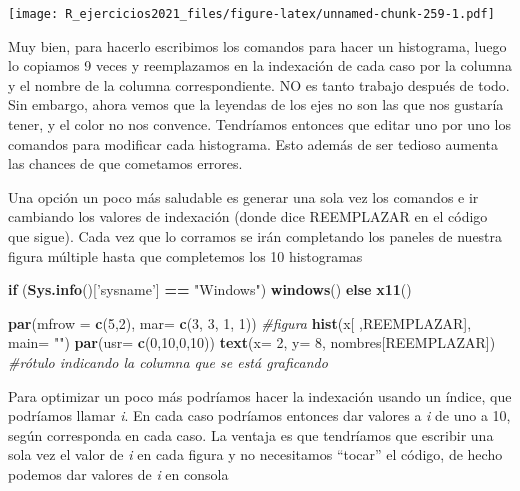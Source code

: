 \documentclass[]{book}
\newenvironment{Shaded}{\begin{snugshade}}{\end{snugshade}}
\newcommand{\CommentTok}[1]{\textcolor[rgb]{0.56,0.35,0.01}{\textit{#1}}}
\newcommand{\ControlFlowTok}[1]{\textcolor[rgb]{0.13,0.29,0.53}{\textbf{#1}}}
\newcommand{\DataTypeTok}[1]{\textcolor[rgb]{0.13,0.29,0.53}{#1}}
\newcommand{\DecValTok}[1]{\textcolor[rgb]{0.00,0.00,0.81}{#1}}
\newcommand{\KeywordTok}[1]{\textcolor[rgb]{0.13,0.29,0.53}{\textbf{#1}}}
\newcommand{\NormalTok}[1]{#1}
\newcommand{\OperatorTok}[1]{\textcolor[rgb]{0.81,0.36,0.00}{\textbf{#1}}}
\newcommand{\StringTok}[1]{\textcolor[rgb]{0.31,0.60,0.02}{#1}}
\begin{document}
\texttt{[image: R\_ejercicios2021\_files/figure-latex/unnamed-chunk-259-1.pdf]}

Muy bien, para hacerlo escribimos los comandos para hacer un histograma, luego lo copiamos 9 veces y reemplazamos en la indexación de cada caso por la columna y el nombre de la columna correspondiente. NO es tanto trabajo después de todo. Sin embargo, ahora vemos que la leyendas de los ejes no son las que nos gustaría tener, y el color no nos convence. Tendríamos entonces que editar uno por uno los comandos para modificar cada histograma. Esto además de ser tedioso aumenta las chances de que cometamos errores.

Una opción un poco más saludable es generar una sola vez los comandos e ir cambiando los valores de indexación (donde dice REEMPLAZAR en el código que sigue). Cada vez que lo corramos se irán completando los paneles de nuestra figura múltiple hasta que completemos los 10 histogramas

\begin{Shaded}
\begin{Highlighting}[]
\ControlFlowTok{if}\NormalTok{ (}\KeywordTok{Sys.info}\NormalTok{()[}\StringTok{'sysname'}\NormalTok{] }\OperatorTok{==}\StringTok{ "Windows"}\NormalTok{) }\KeywordTok{windows}\NormalTok{() }\ControlFlowTok{else} \KeywordTok{x11}\NormalTok{() }

\KeywordTok{par}\NormalTok{(}\DataTypeTok{mfrow =} \KeywordTok{c}\NormalTok{(}\DecValTok{5}\NormalTok{,}\DecValTok{2}\NormalTok{), }\DataTypeTok{mar=} \KeywordTok{c}\NormalTok{(}\DecValTok{3}\NormalTok{, }\DecValTok{3}\NormalTok{, }\DecValTok{1}\NormalTok{, }\DecValTok{1}\NormalTok{))}
\CommentTok{#figura}
\KeywordTok{hist}\NormalTok{(x[ ,REEMPLAZAR], }\DataTypeTok{main=} \StringTok{""}\NormalTok{)}
\KeywordTok{par}\NormalTok{(}\DataTypeTok{usr=} \KeywordTok{c}\NormalTok{(}\DecValTok{0}\NormalTok{,}\DecValTok{10}\NormalTok{,}\DecValTok{0}\NormalTok{,}\DecValTok{10}\NormalTok{)) }
\KeywordTok{text}\NormalTok{(}\DataTypeTok{x=} \DecValTok{2}\NormalTok{, }\DataTypeTok{y=} \DecValTok{8}\NormalTok{, nombres[REEMPLAZAR]) }\CommentTok{#rótulo indicando la columna que se está graficando}
\end{Highlighting}
\end{Shaded}

Para optimizar un poco más podríamos hacer la indexación usando un índice, que podríamos llamar \emph{i}. En cada caso podríamos entonces dar valores a \emph{i} de uno a 10, según corresponda en cada caso. La ventaja es que tendríamos que escribir una sola vez el valor de \emph{i} en cada figura y no necesitamos ``tocar'' el código, de hecho podemos dar valores de \emph{i} en consola
\end{document}

